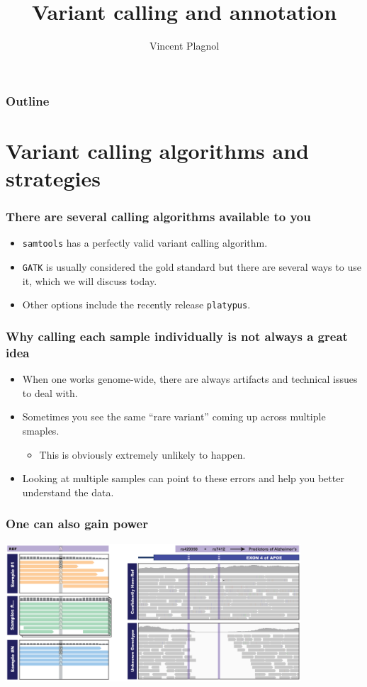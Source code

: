\documentclass{beamer}
\title{Variant calling and annotation}
\author[]{Vincent Plagnol}
\institute{
Inivata- Head of Computational Biology\\
UCL- Reader in Statistical Genetics\\
}
\date{}
\begin{document}
\maketitle


\begin{frame}
  \frametitle{Outline}
  \tableofcontents
\end{frame}





\section{Variant calling algorithms and strategies}


\begin{frame}
  \frametitle{There are several calling algorithms available to you}
  \begin{itemize}
  \item \texttt{samtools} has a perfectly valid variant calling algorithm.
  \item \texttt{GATK} is usually considered the gold standard but there are several ways to use it, which we will discuss today.
  \item Other options include the recently release \texttt{platypus}.
  \end{itemize}
\end{frame}


\begin{frame}
  \frametitle{Why calling each sample individually is not always a great idea}
  \begin{itemize}
  \item When one works genome-wide, there are always artifacts and technical issues to deal with.
  \item Sometimes you see the same ``rare variant'' coming up across multiple smaples.
    \begin{itemize}
    \item This is obviously extremely unlikely to happen.
    \end{itemize}
  \item Looking at multiple samples can point to these errors and help you better understand the data.
  \end{itemize}
\end{frame}

\begin{frame}
  \frametitle{One can also gain power}
  \begin{center}
    \includegraphics[width=11cm]{fig/joint_calling.png}
  \end{center}
\end{frame}
\end{document}
